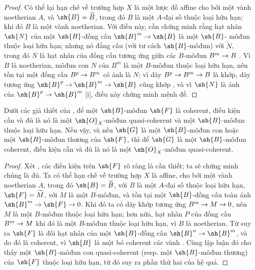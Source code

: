 \documentclass[oneside]{amsart}
\makeatletter
\newcommand{\ega@arrow}[2]{\mathchoice{#1}{#2}{#2}{#2}}
\renewcommand{\to}{\ega@arrow{\longrightarrow}{\rightarrow}}
\newcommand{\oldpage}[2][]{{\marginnote{\normalfont\textbf{#1}~|~#2}}\ignorespaces}
\let\EGAOriginalLabel\label
\renewcommand{\label}[1]{\phantomsection\EGAOriginalLabel{#1}}
\makeatother
\begin{document}
\begin{proof}
Có thể lại hạn chế về trường hợp $X$ là một lược đồ affine cho bởi một vành noetherian $A$, và $\sh{B}=\widetilde{B}$, trong đó $B$ là một $A$-đại số thuộc loại hữu hạn; khi đó $B$ là một vành noetherian.
Với điều này, cần chứng minh rằng hạt nhân $\sh{N}$ của một $\sh{B}$-đồng cấu $\sh{B}^m\to\sh{B}$ là một $\sh{B}$-
\oldpage[I]{180}
môđun thuộc loại hữu hạn; nhưng nó đẳng cấu (với tư cách $\sh{B}$-môđun) với $\widetilde{N}$, trong đó $N$ là hạt nhân của đồng cấu tương ứng giữa các $B$-môđun $B^m\to B$ .
Vì $B$ là noetherian, môđun con $N$ của $B^m$ là một $B$-môđun thuộc loại hữu hạn, nên tồn tại một đồng cấu $B^p\to B^m$ có ảnh là $N$; vì dãy $B^p\to B^m\to B$ là khớp, dãy tương ứng $\sh{B}^p\to\sh{B}^m\to\sh{B}$ cũng khớp , và vì $\sh{N}$ là ảnh của $\sh{B}^p\to\sh{B}^m$ [i], điều này chứng minh mệnh đề.
\end{proof}

\begin{corollary}[9.6.4]
\label{I.9.6.4}
Dưới các giả thiết của , để một $\sh{B}$-môđun $\sh{F}$ là coherent, điều kiện cần và đủ là nó là một $\sh{O}_X$-môđun quasi-coherent và một $\sh{B}$-môđun thuộc loại hữu hạn.
Nếu vậy, và nếu $\sh{G}$ là một $\sh{B}$-môđun con hoặc một $\sh{B}$-môđun thương của $\sh{F}$, thì để $\sh{G}$ là một $\sh{B}$-môđun coherent, điều kiện cần và đủ là nó là một $\sh{O}_X$-môđun quasi-coherent.
\end{corollary}

\begin{proof}
Xét , các điều kiện trên $\sh{F}$ rõ ràng là cần thiết; ta sẽ chứng minh chúng là đủ.
Ta có thể hạn chế về trường hợp $X$ là affine, cho bởi một vành noetherian $A$, trong đó $\sh{B}=\widetilde{B}$, với $B$ là một $A$-đại số thuộc loại hữu hạn, $\sh{F}=\widetilde{M}$, với $M$ là một $B$-môđun, và tồn tại một $\sh{B}$-đồng cấu toàn ánh $\sh{B}^m\to\sh{F}\to0$.
Khi đó ta có dãy khớp tương ứng $B^m\to M\to0$, nên $M$ là một $B$-môđun thuộc loại hữu hạn; hơn nữa, hạt nhân $P$ của đồng cấu $B^m\to M$ khi đó là một $B$-môđun thuộc loại hữu hạn, vì $B$ là noetherian.
Từ  suy ra $\sh{F}$ là đối hạt nhân của một $\sh{B}$-đồng cấu $\sh{B}^n\to\sh{B}^m$, và do đó là coherent, vì $\sh{B}$ là một bó coherent các vành .
Cùng lập luận đó cho thấy một $\sh{B}$-môđun con quasi-coherent (resp. một $\sh{B}$-môđun thương) của $\sh{F}$ thuộc loại hữu hạn, từ đó suy ra phần thứ hai của hệ quả.
\end{proof}
\end{document}
